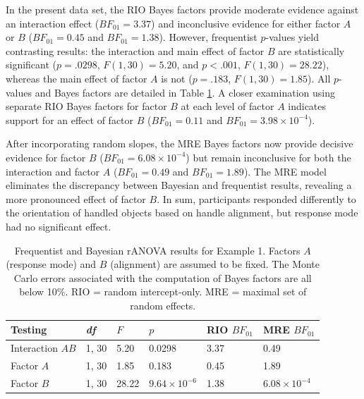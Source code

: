 \documentclass[preprint,12pt,authoryear]{elsarticle}
\begin{document}
In the present data set, the RIO Bayes factors provide moderate evidence against an interaction effect ($\mathit{BF}_{01}=3.37$) and inconclusive evidence for either factor $A$ or $B$ ($\mathit{BF}_{01}=0.45$ and $\mathit{BF}_{01}=1.38$). However, frequentist $p$-values yield contrasting results: the interaction and main effect of factor $B$ are statistically significant ($p=.0298$, $F(1,30)=5.20$, and $p<.001$, $F(1,30)=28.22$), whereas the main effect of factor $A$ is not ($p=.183$, $F(1,30)=1.85$). All $p$-values and Bayes factors are detailed in Table \ref{tbl3}. A closer examination using separate RIO Bayes factors for factor $B$ at each level of factor $A$ indicates support for an effect of factor $B$ ($\mathit{BF}_{01}=0.11$ and $\mathit{BF}_{01}=3.98\times10^{-4}$).

After incorporating random slopes, the MRE Bayes factors now provide decisive evidence for factor $B$ ($\mathit{BF}_{01}=6.08\times10^{-4}$) but remain inconclusive for both the interaction and factor $A$ ($\mathit{BF}_{01}=0.49$ and $\mathit{BF}_{01}=1.89$). The MRE model eliminates the discrepancy between Bayesian and frequentist results, revealing a more pronounced effect of factor $B$. In sum, participants responded differently to the orientation of handled objects based on handle alignment, but response mode had no significant effect.

\begin{table}[t]
	\centering
	\begin{tabular}{@{}llllll@{}}
		\toprule
		Testing          & \textit{df} & $F$   & $p$                 & RIO $\mathit{BF}_{01}$ & MRE $\mathit{BF}_{01}$ \\ \midrule
		Interaction $AB$ & 1, 30       & 5.20  & 0.0298              & 3.37                   & 0.49                   \\
		Factor $A$       & 1, 30       & 1.85  & 0.183               & 0.45                   & 1.89                   \\
		Factor $B$       & 1, 30       & 28.22 & $9.64\times10^{-6}$ & 1.38                   & $6.08\times10^{-4}$    \\ \bottomrule
	\end{tabular}
\caption{Frequentist and Bayesian rANOVA results for Example 1. Factors $A$ (response mode) and $B$ (alignment) are assumed to be fixed. The Monte Carlo errors associated with the computation of Bayes factors are all below 10\%. RIO = random intercept-only. MRE = maximal set of random effects.}\label{tbl3}
\end{table}
\end{document}
